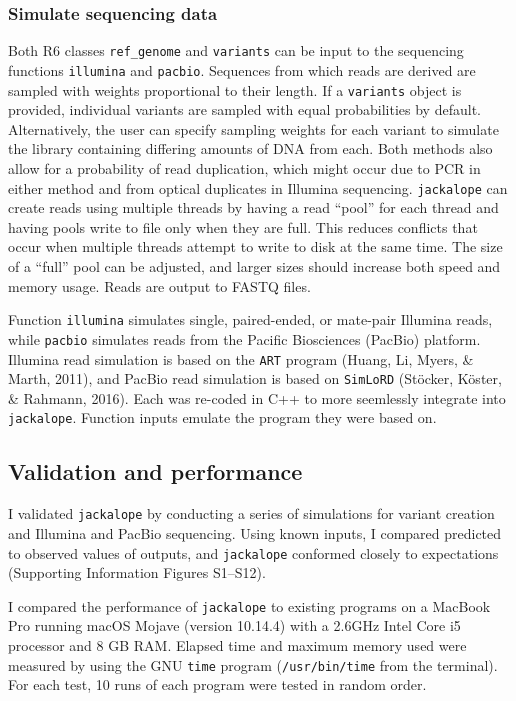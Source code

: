 \documentclass[12pt,]{article}
\begin{document}
\hypertarget{simulate-sequencing-data}{%
\subsubsection{Simulate sequencing data}\label{simulate-sequencing-data}}

Both R6 classes \texttt{ref\_genome} and \texttt{variants} can be input to the sequencing functions
\texttt{illumina} and \texttt{pacbio}.
Sequences from which reads are derived are sampled with weights proportional to
their length.
If a \texttt{variants} object is provided, individual variants are sampled with equal
probabilities by default.
Alternatively, the user can specify sampling weights for each variant
to simulate the library containing differing amounts of DNA from each.
Both methods also allow for a probability of read duplication, which might occur
due to PCR in either method and from optical duplicates in Illumina sequencing.
\texttt{jackalope} can create reads using multiple threads by having a read ``pool'' for
each thread and having pools write to file only when they are full.
This reduces conflicts that occur when multiple threads attempt to write to disk
at the same time.
The size of a ``full'' pool can be adjusted, and larger sizes should increase both
speed and memory usage.
Reads are output to FASTQ files.

Function \texttt{illumina} simulates single, paired-ended, or mate-pair Illumina reads,
while \texttt{pacbio} simulates reads from the Pacific Biosciences (PacBio) platform.
Illumina read simulation is based on the \texttt{ART} program
(Huang, Li, Myers, \& Marth, 2011), and
PacBio read simulation is based on \texttt{SimLoRD}
(Stöcker, Köster, \& Rahmann, 2016).
Each was re-coded in C++ to more seemlessly integrate into \texttt{jackalope}.
Function inputs emulate the program they were based on.

\hypertarget{validation-and-performance}{%
\subsection{Validation and performance}\label{validation-and-performance}}

I validated \texttt{jackalope} by conducting a series of simulations for variant creation
and Illumina and PacBio sequencing.
Using known inputs, I compared predicted to observed values of outputs,
and \texttt{jackalope} conformed closely to expectations
(Supporting Information Figures S1--S12).

I compared the performance of \texttt{jackalope} to existing programs on a MacBook
Pro running macOS Mojave (version 10.14.4) with a 2.6GHz Intel Core i5 processor
and 8 GB RAM.
Elapsed time and maximum memory used were measured by using the GNU \texttt{time} program
(\texttt{/usr/bin/time} from the terminal).
For each test, 10 runs of each program were tested in random order.
\end{document}
